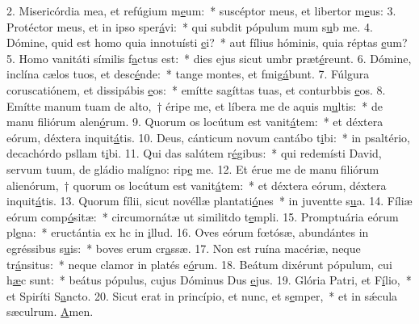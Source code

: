 2. Misericórdia mea, et refúgium m\uline{e}um:~* suscéptor meus, et libertor m\uline{e}us:
3. Protéctor meus, et in ipso sper\uline{á}vi:~* qui subdit pópulum mum s\uline{u}b me.
4. Dómine, quid est homo quia innotuísti \uline{e}i?~* aut fílius hóminis, quia réptas \uline{e}um?
5. Homo vanitáti símilis f\uline{a}ctus est:~* dies ejus sicut umbr præt\uline{é}reunt.
6. Dómine, inclína cælos tuos, et desc\uline{é}nde:~* tange montes, et fmig\uline{á}bunt.
7. Fúlgura coruscatiónem, et dissipábis \uline{e}os:~* emítte sagíttas tuas, et conturbbis \uline{e}os.
8. Emítte manum tuam de alto,~† éripe me, et líbera me de aquis m\uline{u}ltis:~* de manu filiórum alen\uline{ó}rum.
9. Quorum os locútum est vanit\uline{á}tem:~* et déxtera eórum, déxtera inquit\uline{á}tis.
10. Deus, cánticum novum cantábo t\uline{i}bi:~* in psaltério, decachórdo psllam t\uline{i}bi.
11. Qui das salútem r\uline{é}gibus:~* qui redemísti David, servum tuum, de gládio malígno: rip\uline{e} me.
12. Et érue me de manu filiórum alienórum,~† quorum os locútum est vanit\uline{á}tem:~* et déxtera eórum, déxtera inquit\uline{á}tis.
13. Quorum fílii, sicut novéllæ plantati\uline{ó}nes~* in juventte s\uline{u}a.
14. Fíliæ eórum comp\uline{ó}sitæ:~* circumornátæ ut similitdo t\uline{e}mpli.
15. Promptuária eórum pl\uline{e}na:~* eructántia ex hc in \uline{i}llud.
16. Oves eórum fœtósæ, abundántes in egréssibus s\uline{u}is:~* boves erum cr\uline{a}ssæ.
17. Non est ruína macériæ, neque tr\uline{á}nsitus:~* neque clamor in platés e\uline{ó}rum.
18. Beátum dixérunt pópulum, cui h\uline{æ}c sunt:~* beátus pópulus, cujus Dóminus Dus \uline{e}jus.
19. Glória Patri, et F\uline{í}lio,~* et Spiríti S\uline{a}ncto.
20. Sicut erat in princípio, et nunc, et s\uline{e}mper,~* et in sǽcula sæculrum. \uline{A}men.
